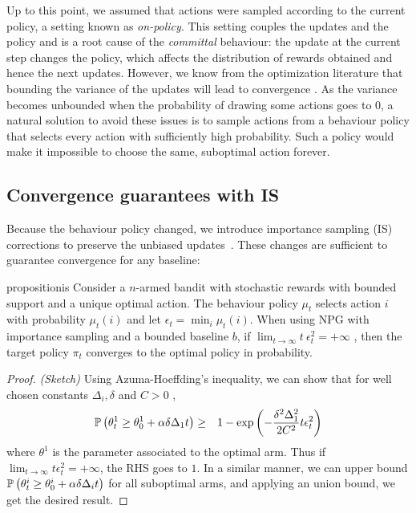 Up to this point, we assumed that actions were sampled according to the current policy, a setting known as \emph{on-policy}. This setting couples the updates and the policy and is a root cause of the \textit{committal} behaviour: the update at the current step changes the policy, which affects the distribution of rewards obtained and hence the next updates. 
However, we know from the optimization literature that bounding the variance of the updates will lead to convergence \citep{bottou2018optimization}. As the variance becomes unbounded when the probability of drawing some actions goes to 0, a natural solution to avoid these issues is to sample actions from a behaviour policy that selects every action with sufficiently high probability.
Such a policy would make it impossible to choose the same, suboptimal action forever. 

\subsection{Convergence guarantees with IS}

Because the behaviour policy changed, we introduce importance sampling (IS) corrections to preserve the unbiased updates~\citep{kahn1951estimation, precup2000eligibility}. 
These changes are sufficient to guarantee convergence for any baseline:

\begin{restatable}[]{proposition}{is}
\label{lem:main_off-policy_IS}
Consider a $n$-armed bandit with stochastic rewards with bounded support and a unique optimal action. The behaviour policy $\mu_t$ selects action $i$ with probability $\mu_t(i)$ and let $\epsilon_t = \min_i \mu_t(i)$. When using NPG with importance sampling and a bounded baseline $b$, if $\lim_{t \to \infty} t \ \epsilon_t^2 = +\infty$ , then the target policy $\pi_t$ converges to the optimal policy in probability.
\end{restatable}
\begin{proof} 
\textit{(Sketch)}
Using Azuma-Hoeffding's inequality, we can show that for well chosen constants $\Delta_i, \delta$ and $C > 0$ ,
\begin{eqnarray*}
\sP\left( \theta_t^1 \ge  \theta_0^1 + \alpha \delta \Delta_1 t\right) %
&\ge& 1- \exp \left( -\frac{\delta^2 \Delta_1^2}{2 C^2}t \epsilon_t^2 \right)\\
\end{eqnarray*} 
where $\theta^1$ is the parameter associated to the optimal arm.
Thus if $\lim_{t\to\infty} t \epsilon_t^2 = +\infty$, the RHS goes to $1$. 
In a similar manner, we can upper bound ${\mathbb{P}}\left( \theta_t^i \ge  \theta_0^i + \alpha \delta \Delta_i t\right)$ for all suboptimal arms, and 
applying an union bound, we get the desired result.
\end{proof}
\vspace{-3mm}

